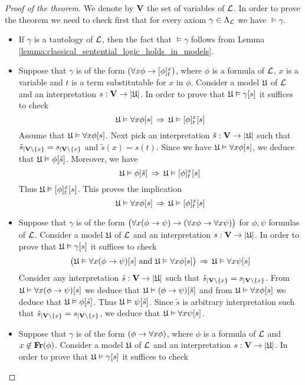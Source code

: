 \documentclass[10pt]{amsart}
\begin{document}
\begin{proof}[Proof of the theorem]
	We denote by $\mathbf{V}$ the set of variables of ${\mathcal L}$. In order to prove the theorem we need to check first that for every axiom $\gamma \in \Lambda_{{\mathcal L}}$ we have $\vDash \gamma$.
	\begin{itemize}
		\item If $\gamma$ is a tautology of ${\mathcal L}$, then the fact that $\vDash \gamma$ follows from Lemma \ref{lemma:classical_sentential_logic_holds_in_models}.
		\item Suppose that $\gamma$ is of the form $\left(\forall x\phi \rightarrow [\phi]^x_t\right)$, where $\phi$ is a formula of ${\mathcal L}$, $x$ is a variable and $t$ is a term substitutable for $x$ in $\phi$. Consider a model ${\mathfrak U}$ of ${\mathcal L}$ and an interpretation $s:\mathbf{V} \rightarrow |{\mathfrak U}|$. In order to prove that ${\mathfrak U} \vDash \gamma[s]$ it suffices to check
		      $${\mathfrak U} \vDash \forall x\phi[s] \,\Rightarrow\,  {\mathfrak U} \vDash [\phi]^x_t[s]$$
		      Assume that ${\mathfrak U} \vDash \forall x\phi[s]$. Next pick an interpretation $\tilde{s}: \mathbf{V} \rightarrow |{\mathfrak U}|$ such that $\tilde{s}_{\mid \mathbf{V}\setminus \{x\}} =s_{\mid \mathbf{V}\setminus \{x\}}$ and $\tilde{s}(x) = s(t)$. Since we have ${\mathfrak U} \vDash \forall x\phi[s]$, we deduce that ${\mathfrak U} \vDash \phi[\tilde{s}]$. Moreover, we have
		      $${\mathfrak U} \vDash \phi[\tilde{s}] \,\Rightarrow\,{\mathfrak U} \vDash [\phi]^x_t[s]$$
		      Thus ${\mathfrak U} \vDash [\phi]^x_t[s]$. This proves the implication
		      $${\mathfrak U} \vDash \forall x\phi[s] \,\Rightarrow\, {\mathfrak U} \vDash [\phi]^x_t[s]$$
		\item Suppose that $\gamma$ is of the form $\big(\forall x (\phi \rightarrow \psi) \rightarrow (\forall x\phi \rightarrow \forall x\psi)\big)$ for $\phi, \psi$ formulas of ${\mathcal L}$. Consider a model ${\mathfrak U}$ of ${\mathcal L}$ and an interpretation $s:\mathbf{V} \rightarrow |{\mathfrak U}|$. In order to prove that ${\mathfrak U} \vDash \gamma[s]$ it suffices to check
		      $$\big({\mathfrak U} \vDash \forall x (\phi \rightarrow \psi) [s]\mbox{ and }{\mathfrak U} \vDash \forall x\phi[s]\big) \,\Rightarrow\, {\mathfrak U} \vDash \forall x\psi[s]$$
		      Consider any interpretation $\tilde{s}:\mathbf{V} \rightarrow |{\mathfrak U}|$ such that $\tilde{s}_{\mid \mathbf{V}\setminus \{x\}} = s_{\mid \mathbf{V}\setminus \{x\}}$. From ${\mathfrak U} \vDash \forall x (\phi \rightarrow \psi) [s]$ we deduce that ${\mathfrak U} \vDash (\phi \rightarrow \psi) [\tilde{s}]$ and from ${\mathfrak U} \vDash \forall x\phi[s]$ we deduce that ${\mathfrak U} \vDash \phi[\tilde{s}]$. Thus ${\mathfrak U} \vDash \psi[\tilde{s}]$. Since $\tilde{s}$ is arbitrary interpretation such that $\tilde{s}_{\mid \mathbf{V}\setminus \{x\}} = s_{\mid \mathbf{V}\setminus \{x\}}$, we deduce that ${\mathfrak U} \vDash \forall x\psi[s]$.
		\item Suppose that $\gamma$ is of the form $\left(\phi \rightarrow \forall x\phi\right)$, where $\phi$ is a formula of ${\mathcal L}$ and $x \not \in \mathbf{Fr}(\phi)$. Consider a model ${\mathfrak U}$ of ${\mathcal L}$ and an interpretation $s:\mathbf{V} \rightarrow |{\mathfrak U}|$. In order to prove that ${\mathfrak U} \vDash \gamma[s]$ it suffices to check

\end{itemize}
\end{proof}
\end{document}
